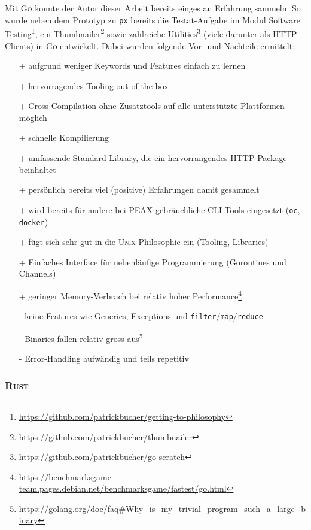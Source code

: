 Mit \textsc{Go} konnte der Autor dieser Arbeit bereits einges an Erfahrung sammeln. So wurde neben dem Prototyp zu \texttt{px} bereits die Testat-Aufgabe im Modul Software Testing\footnote{\url{https://github.com/patrickbucher/getting-to-philosophy}}, ein Thumbnailer\footnote{\url{https://github.com/patrickbucher/thumbnailer}} sowie zahlreiche Utilities\footnote{\url{https://github.com/patrickbucher/go-scratch}} (viele darunter als HTTP-Clients) in \textsc{Go} entwickelt. Dabei wurden folgende Vor- und Nachteile ermittelt:

\begin{itemize}
    \item[+] aufgrund weniger Keywords und Features einfach zu lernen
    \item[+] hervorragendes Tooling out-of-the-box
    \item[+] Cross-Compilation ohne Zusatztools auf alle unterstützte Plattformen möglich
    \item[+] schnelle Kompilierung
    \item[+] umfassende Standard-Library, die ein hervorrangendes HTTP-Package beinhaltet
    \item[+] persönlich bereits viel (positive) Erfahrungen damit gesammelt
    \item[+] wird bereits für andere bei PEAX gebräuchliche CLI-Tools eingesetzt (\texttt{oc}, \texttt{docker})
    \item[+] fügt sich sehr gut in die \textsc{Unix}-Philosophie ein (Tooling, Libraries)
    \item[+] Einfaches Interface für nebenläufige Programmierung (Goroutines und Channels)
    \item[+] geringer Memory-Verbrach bei relativ hoher Performance\footnote{\url{https://benchmarksgame-team.pages.debian.net/benchmarksgame/fastest/go.html}}
    \item[-] keine Features wie Generics, Exceptions und \texttt{filter}/\texttt{map}/\texttt{reduce}
    \item[-] Binaries fallen relativ gross aus\footnote{\url{https://golang.org/doc/faq\#Why\_is\_my\_trivial\_program\_such\_a\_large\_binary}}
    \item[-] Error-Handling aufwändig und teils repetitiv
\end{itemize}

\subsubsection{\textsc{Rust}}

